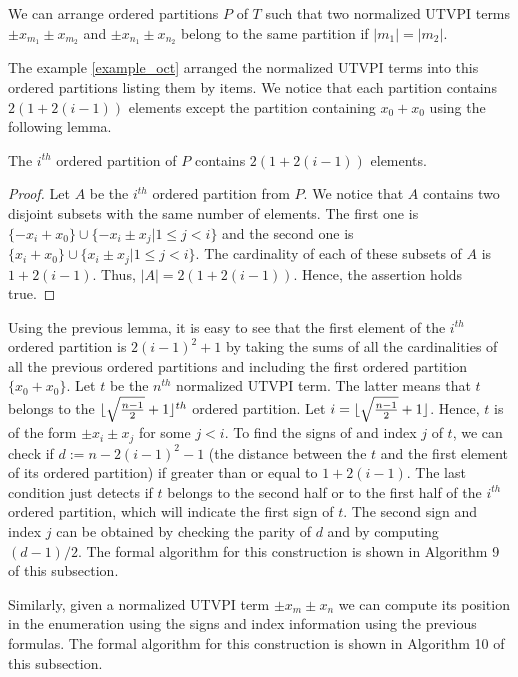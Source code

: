 We can arrange ordered partitions $P$ of $T$ such 
that two normalized UTVPI terms $\pm x_{m_1} \pm x_{m_2}$
and $\pm x_{n_1} \pm x_{n_2}$ belong to the same partition
if $|m_1| = |m_2|$.

The example \ref{example_oct} arranged the normalized 
UTVPI terms into this ordered partitions listing them
by items. We notice that each partition
contains $2(1 + 2(i-1))$ elements except the
partition containing $x_0 + x_0$ using the 
following lemma.

\begin{lemma}
  The $i^{th}$ ordered partition of $P$ contains 
  $2(1 + 2(i-1))$ elements.
\end{lemma}

\begin{proof}
  Let $A$ be the $i^{th}$ ordered partition from 
  $P$. We notice that $A$ contains two
  disjoint subsets with the same number of elements.
  The first one is $\{-x_i + x_0\} \cup 
  \{-x_i \pm x_j | 1 \leq j < i \}$
  and the second one is 
  $\{x_i + x_0\} \cup \{x_i \pm x_j | 1 \leq j < i \}$.
  The cardinality of each of these subsets of $A$
  is $1 + 2(i-1)$. Thus, $|A| = 2(1 + 2(i-1))$. Hence,
  the assertion holds true.
\end{proof}

Using the previous lemma, it is easy to see
that the first element of the $i^{th}$ ordered partition 
is $2(i-1)^2 + 1$ by taking the sums of all the 
cardinalities of all the previous ordered partitions
and including the first ordered partition 
$\{ x_0 + x_0 \}$. Let $t$ be the $n^{th}$ normalized 
UTVPI term. The latter means that $t$ belongs
to the 
$\lfloor \sqrt{\frac{n-1}{2}} + 1 \rfloor^{th}$ ordered 
partition. Let $i = \lfloor \sqrt{\frac{n-1}{2}} + 1 \rfloor$.
Hence, $t$ is
of the form $\pm x_i \pm x_j$ for some $j < i$.
To find the signs of and index $j$ of $t$, 
we can check if $d := n - 2(i-1)^2 -1$ 
(the distance between the $t$ and the
first element of its ordered partition) 
if greater than or equal to $1 + 2(i-1)$. The last 
condition just detects if $t$ belongs to the second
half or to the first half of the $i^{th}$ ordered
partition, which will indicate the first sign of $t$.
The second sign and index $j$ can be obtained by checking
the parity of $d$ and by computing $(d-1)/2$.
The formal algorithm for this construction is shown in Algorithm 9 of 
this subsection. 

Similarly, given a normalized UTVPI term $\pm x_m \pm x_n$
we can compute its position in the enumeration using the
signs and index information using the previous formulas.
The formal algorithm for this construction is shown in Algorithm 10
of this subsection.

